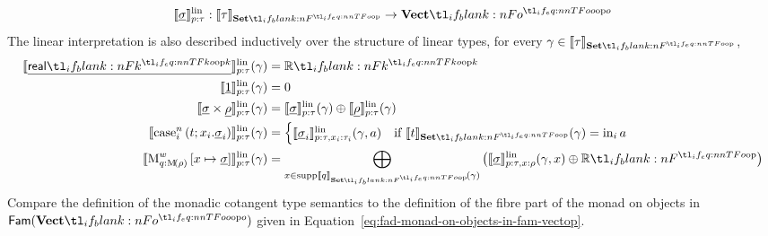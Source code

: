 \documentclass[11pt,a4paper]{article}
\theoremstyle{definition}
\theoremstyle{remark}
\providecommand{\Fam}[1]{\mathsf{Fam}(#1)}
\providecommand{\supp}{\operatorname{supp}}
\providecommand{\lintype}[1]{\underline{#1}}
\providecommand{\setint}[1]{\llbracket #1\rrbracket_{\Set}}
\providecommand{\linint}[2]{\llbracket #1\rrbracket_{#2}^{\mathrm{lin}}}
\begin{document}
\begin{equation*}
  \linint{\lintype{\sigma}}{p : \tau}:
  \setint{\tau} \to \Vect[o]
\end{equation*}
The linear interpretation is also described inductively over the structure of linear types, for every \( \gamma \in \setint{\tau} \),
\begin{equation}
  \label{eq:appendix-target-language-interpretation-inductive-definition}
  \begin{aligned}
    \Fun[np]{
    \linint{\lintype{\srcreal[k]}}{p : \tau}
    }{ \gamma }
    &= \R[k]
    \\
    \Fun[np]{
    \linint{\lintype{1}}{p : \tau}
    }{ \gamma }
    &= 0
    \\
    \Fun[np]{
    \linint{\lintype{\sigma} \times \lintype{\rho}}{p : \tau}
    }{ \gamma }
    &= 
      \Fun[np]{
      \linint{\lintype{\sigma}}{p : \tau}
      }{ \gamma }
      \oplus
      \Fun[np]{
      \linint{\lintype{\rho}}{p : \tau}
      }{ \gamma }
    \\
    \Fun[np]{
    \linint{
    \casenst{t}{i}{n}{x_{i}}{\lintype{\sigma}_{i}}
    }{p : \tau}
    }{ \gamma }
    &=
      \begin{cases}
        \Fun[np]{
        \linint{\lintype{\sigma}_{i}}{p : \tau, x_{i} : \tau_{i}}
        }{ \gamma, a }
        &\text{if }
          \fn[n]{ \setint{t} }{ \gamma } = \opn[b]{in}_{i} a
      \end{cases}
    \\
    \Fun[np]{
    \linint{
    \opn[b]{M}^{w}_{q : \Fun[nn]{ \opn[b]{M} }{ \rho }}
    \left[ x \mapsto \lintype{\sigma} \right]
    }{p : \tau}
    }{ \gamma }
    &=
      \bigoplus_{x \in \supp \fn[n]{ \setint{q} }{\gamma} }
      \left(
      \fn[n]{ \linint{\lintype{\sigma}}{p : \tau, x : \rho} }{ \gamma, x } \oplus \R
      \right)
  \end{aligned}
\end{equation}
Compare the definition of the monadic cotangent type semantics to the definition of the fibre part of the monad on objects in \( \Fam{\Vect[o]} \) given in Equation~\ref{eq:fad-monad-on-objects-in-fam-vectop}.
\end{document}
